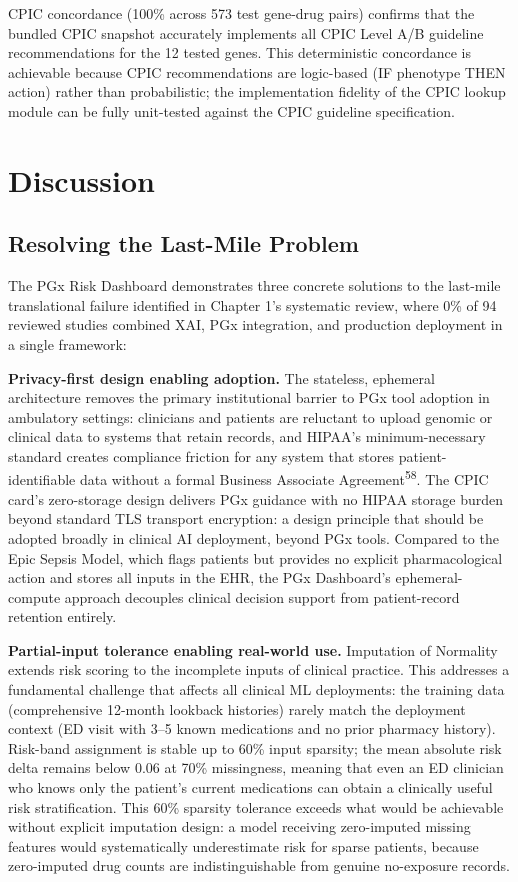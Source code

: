 \documentclass[
  12pt,
]{book}
\begin{document}
CPIC concordance (100\% across 573 test gene-drug pairs) confirms that
the bundled CPIC snapshot accurately implements all CPIC Level A/B
guideline recommendations for the 12 tested genes. This deterministic
concordance is achievable because CPIC recommendations are logic-based
(IF phenotype THEN action) rather than probabilistic; the implementation
fidelity of the CPIC lookup module can be fully unit-tested against the
CPIC guideline specification.

\chapter{Discussion}\label{sec-discussion}

\section{Resolving the Last-Mile
Problem}\label{resolving-the-last-mile-problem}

The PGx Risk Dashboard demonstrates three concrete solutions to the
last-mile translational failure identified in Chapter 1's systematic
review, where 0\% of 94 reviewed studies combined XAI, PGx integration,
and production deployment in a single framework:

\textbf{Privacy-first design enabling adoption.} The stateless,
ephemeral architecture removes the primary institutional barrier to PGx
tool adoption in ambulatory settings: clinicians and patients are
reluctant to upload genomic or clinical data to systems that retain
records, and HIPAA's minimum-necessary standard creates compliance
friction for any system that stores patient-identifiable data without a
formal Business Associate Agreement\textsuperscript{58}. The CPIC card's
zero-storage design delivers PGx guidance with no HIPAA storage burden
beyond standard TLS transport encryption: a design principle that should
be adopted broadly in clinical AI deployment, beyond PGx tools. Compared
to the Epic Sepsis Model, which flags patients but provides no explicit
pharmacological action and stores all inputs in the EHR, the PGx
Dashboard's ephemeral-compute approach decouples clinical decision
support from patient-record retention entirely.

\textbf{Partial-input tolerance enabling real-world use.} Imputation of
Normality extends risk scoring to the incomplete inputs of clinical
practice. This addresses a fundamental challenge that affects all
clinical ML deployments: the training data (comprehensive 12-month
lookback histories) rarely match the deployment context (ED visit with
3--5 known medications and no prior pharmacy history). Risk-band
assignment is stable up to 60\% input sparsity; the mean absolute risk
delta remains below 0.06 at 70\% missingness, meaning that even an ED
clinician who knows only the patient's current medications can obtain a
clinically useful risk stratification. This 60\% sparsity tolerance
exceeds what would be achievable without explicit imputation design: a
model receiving zero-imputed missing features would systematically
underestimate risk for sparse patients, because zero-imputed drug counts
are indistinguishable from genuine no-exposure records.
\end{document}
